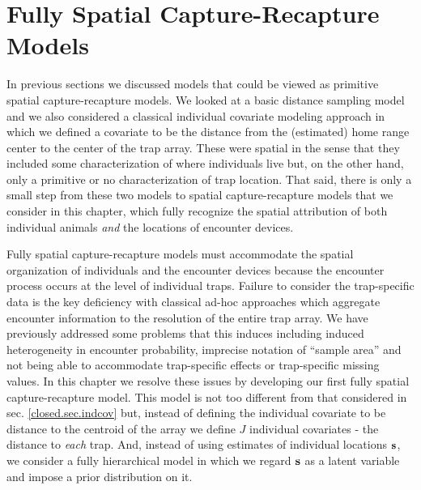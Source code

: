 





\chapter{Fully Spatial Capture-Recapture Models}
\label{chapt.scr0}

\vspace{.3in}

In previous sections we discussed models that could be
viewed as primitive spatial capture-recapture models. We looked at a
basic distance sampling model and we also considered a classical
individual covariate modeling approach in which we defined a covariate
to be the distance from the (estimated) home range center to the center of
the trap array. These were spatial in the sense that they included
some characterization of where individuals live but, on the other
hand, only a primitive or no characterization of trap location.  That
said, there is only a small step from these two models to spatial
capture-recapture models that we consider in this chapter, which fully
recognize the spatial attribution of both individual animals {\it and}
the locations of encounter devices.

Fully spatial capture-recapture models must accommodate the spatial
organization of individuals and the encounter devices because the
encounter process occurs at the level of individual traps.  Failure to
consider the trap-specific data is the key deficiency
with classical ad-hoc approaches which aggregate encounter information
to the resolution of the entire trap array. We have  previously
addressed some problems that this induces including induced
heterogeneity in encounter probability, imprecise notation of ``sample
area'' and not being able to accommodate trap-specific
effects or trap-specific missing values.
In this chapter we resolve these issues by developing 
our first fully spatial capture-recapture
model. This model is not too different from
that considered in sec. \ref{closed.sec.indcov} but, 
instead of defining the individual covariate to be distance
to the centroid of the array we define $J$ individual covariates - the
distance to {\it each} trap. And, instead of using estimates of
individual locations ${\bf s}$, we consider a fully hierarchical model in
which we regard ${\bf s}$ as a latent variable and impose a prior
distribution on it.  




